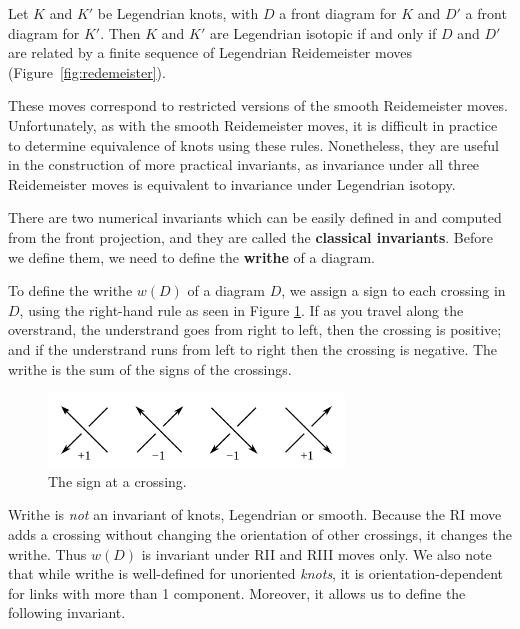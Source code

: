 \begin{theorem}
    Let $K$ and $K'$ be Legendrian knots, with $D$ a front diagram for $K$ and $D'$ a front diagram for $K'$.
    Then $K$ and $K'$ are Legendrian isotopic if and only if $D$ and $D'$ are related by a finite sequence of Legendrian Reidemeister moves (Figure~\ref{fig:redemeister}).
\end{theorem}

These moves correspond to restricted versions of the smooth Reidemeister moves.
Unfortunately, as with the smooth Reidemeister moves, it is difficult in practice to determine equivalence of knots using these rules. Nonetheless, they are useful in the construction of more practical invariants, as invariance under all three Reidemeister moves is equivalent to invariance under Legendrian isotopy.


There are two numerical invariants which can be easily defined in and computed from the front projection, and they are called the \textbf{classical invariants}. Before we define them, we need to define the \textbf{writhe} of a diagram.

To define the writhe $w(D)$ of a diagram $D$, we assign a sign to each crossing in $D$, using the right-hand rule as seen in Figure \ref{fig:writhe}. If as you travel along the overstrand, the understrand goes from right to left, then the crossing is positive; and if the understrand runs from left to right then the crossing is negative. 
The writhe is the sum of the signs of the crossings.

\begin{figure}[ht]
    \centering
    \includegraphics[width=0.7\textwidth]{images/writhe.pdf}
    \caption{The sign at a crossing.}
    \label{fig:writhe}
\end{figure}

Writhe is \emph{not} an invariant of knots, Legendrian or smooth. Because the RI move adds a crossing without changing the orientation of other crossings, it changes the writhe. Thus $w(D)$ is invariant under RII and RIII moves only. We also note that while writhe is well-defined for unoriented \emph{knots}, it is orientation-dependent for links with more than 1 component. Moreover, it allows us to define the following invariant.

